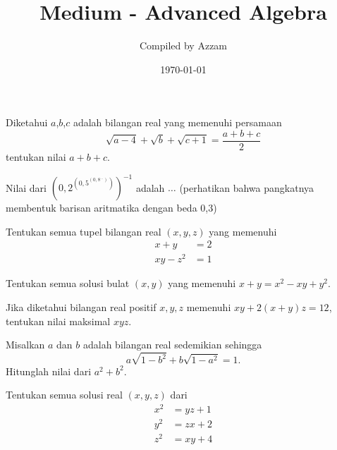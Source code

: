 \documentclass[12pt]{scrartcl}
\begin{document}
	\title{Medium - Advanced Algebra} %
	\date{\today}
	\author{Compiled by Azzam}
	\maketitle

\renewcommand*\contentsname{Daftar Isi}
\tableofcontents

\newpage
	
	\begin{soalbaru}
	Diketahui $a$,$b$,$c$ adalah bilangan real yang memenuhi persamaan
	$$\sqrt{a-4}+\sqrt{b}+\sqrt{c+1}=\dfrac{a+b+c}{2}$$
	tentukan nilai $a+b+c$.
	\end{soalbaru}
	
	\begin{soalbaru}
	Nilai dari $\left(0,2 ^{\left(0,5 ^{\left(0,8 ^{...} \right)} \right)} \right)^{-1}$ adalah $\dots$ (perhatikan bahwa pangkatnya membentuk barisan aritmatika dengan beda 0,3)
	\end{soalbaru}
	
	\begin{soalbaru}
	Tentukan semua tupel bilangan real $(x,y,z)$ yang memenuhi
	\begin{align*}
	  x+y &= 2 \\
	xy-z^2 &= 1  
	\end{align*}
	\end{soalbaru}
	
	\begin{soalbaru}
	Tentukan semua solusi bulat $(x,y)$ yang memenuhi 
	$x+y=x^2-xy+y^2.$
	\end{soalbaru}
	
    \begin{soalbaru}
    Jika diketahui bilangan real positif $x,y,z$ memenuhi $xy+2(x+y)z=12$, tentukan nilai maksimal $xyz.$
    \end{soalbaru}
    
    \begin{soalbaru}
    Misalkan $a$ dan $b$ adalah bilangan real sedemikian sehingga $$a\sqrt{1-b^2}+b\sqrt{1-a^2}=1.$$
    Hitunglah nilai dari $a^2+b^2$.
    \end{soalbaru}
    
    \begin{soalbaru}
    Tentukan semua solusi real $(x,y,z)$ dari
    \begin{align*}
        x^2 &= yz+1\\
        y^2 &= zx+2\\
        z^2 &= xy+4
    \end{align*}
    \end{soalbaru}
    
\end{document}
